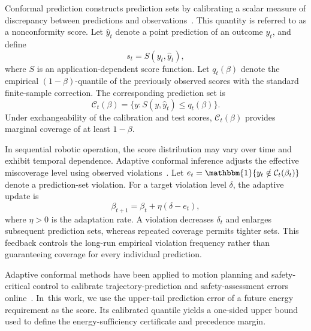 Conformal prediction constructs prediction sets by calibrating a scalar measure of discrepancy between predictions and observations~\cite{shafer2008tutorial}.
This quantity is referred to as a nonconformity score.
Let $\widehat{y}_t$ denote a point prediction of an outcome $y_t$, and define
\begin{equation}
    s_t=S(y_t, \widehat{y}_t),
\end{equation}
where $S$ is an application-dependent score function.
Let $q_t(\beta)$ denote the empirical $(1-\beta)$-quantile of the previously observed scores with the standard finite-sample correction.
The corresponding prediction set is
\begin{equation}
    \mathcal{C}_t(\beta)=\{
    y:S(y, \widehat{y}_t)\leq q_t(\beta) \}.
    \label{eq:conformal_set}
\end{equation}
Under exchangeability of the calibration and test scores, $\mathcal{C}_t(\beta)$ provides marginal coverage of at least $1-\beta$.

In sequential robotic operation, the score distribution may vary over time and exhibit temporal dependence.
Adaptive conformal inference adjusts the effective miscoverage level using observed violations~\cite{gibbs2021adaptive}.
Let $e_t=\mathbbm{1}\{y_t\notin\mathcal{C}_t(\beta_t)\}$ denote a prediction-set violation.
For a target violation level $\delta$, the adaptive update is
\begin{equation}
    \beta_{t+1} = \beta_t + \eta(\delta-e_t),
    \label{eq:adaptive_conformal_update}
\end{equation}
where $\eta>0$ is the adaptation rate.
A violation decreases $\delta_t$ and enlarges subsequent prediction sets, whereas repeated coverage permits tighter sets.
This feedback controls the long-run empirical violation frequency rather than guaranteeing coverage for every individual prediction.

Adaptive conformal methods have been applied to motion planning and safety-critical control to calibrate trajectory-prediction and safety-assessment errors online~\cite{zhou2024safety, huriot2026safe}.
In~this work, we use the upper-tail prediction error of a future energy requirement as the score.
Its calibrated quantile yields a one-sided upper bound used to define the energy-sufficiency certificate and precedence margin.